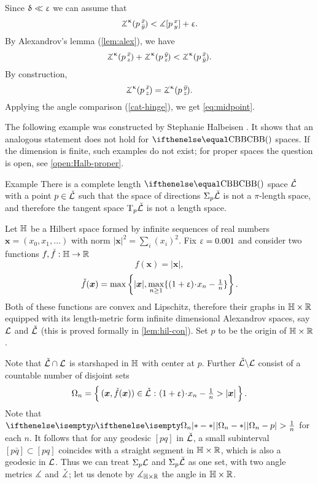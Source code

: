 Since $\updelta\ll \upvarepsilon$  we can assume that 
\[\angk\kappa p{\bar x}{\bar y}<\mangle \hinge pxy+\eps.\]
By  Alexandrov's lemma (\ref{lem:alex}), we have
\[\angk\kappa p{\bar x}{z}+\angk\kappa p{\bar y}{z}< \angk\kappa p{\bar x}{\bar y}.\]
By construction,
\[\angk\kappa p{\bar x}{z}=\angk\kappa p{\bar y}{z}.\]
Applying the angle comparison (\ref{cat-hinge}), we get \ref{eq:midpoint}.
\qeds

The following example was constructed by Stephanie Halbeisen \cite{halbeisen}.
It shows that an analogous statement does not hold for $\Alex{}$ spaces.
If the dimension is finite, such examples do not exist; %
for proper spaces the question is open, see \ref{open:Halb-proper}.

\begin{thm}{Example}\label{Halbeisen's example}
There is a complete length $\Alex{}$ space $\check{\mathcal{L}}$
with a point $p\in\check{\spc{L}}$ such that the space of directions $\Sigma_p\check{\mathcal{L}}$ is not a $\pi$-length space, and therefore the tangent space $\text{\rm T}_p\check{\mathcal{L}}$ is not a length space. 
\end{thm}



Let $\mathbb{H}$ be a Hilbert space formed by infinite sequences of real numbers $\bm{x}=(x_0,x_1,\dots)$ with norm
$|\bm{x}|^2=\sum_i(x_i)^2$. 
Fix $\upvarepsilon=0.001$ and consider two functions $f,\check f:\HH\to\RR$
\[f(\bm{x})=|\bm{x}|,\]
\[\check f(\bm{x})
=
\max\left\{|\bm{x}|,\max_{n\ge1}\{(1+\eps)\cdot x_n-\tfrac{1}{n}\}\right\}.\] 
Both of these functions are convex and Lipschitz, therefore their graphs in $\HH\times \RR$ equipped with its length-metric form infinite dimensional Alexandrov spaces, say $\mathcal{L}$  and $\check{\mathcal{L}}$ (this is proved formally in \ref{lem:hil-con}).
Set $p$ to be the origin of $\HH\times \RR$.

Note that $\check{\spc{L}}\cap\spc{L}$ is starshaped in $\mathbb{H}$ with center at $p$.
Further $\check{\mathcal{L}}\backslash\mathcal{L}$ consist of a countable number of disjoint sets
\[\Omega_n=\set{(\bm{x},\check f(\bm{x}))\in\check{\spc{L}}}{(1+\eps)\cdot x_n-\tfrac{1}{n}>|\bm{x}|}.\]
Note that $\dist{\Omega_n}{p}{}>\tfrac{1}{n}$ for each $n$.
It follows that for any geodesic $[p q]$ in $\check{\mathcal{L}}$,
a small subinterval $[p \bar q]\subset [p q]$ 
coincides with a straight segment in $\HH\times\RR$, 
which is also a geodesic in $\mathcal{L}$.
Thus we can treat $\Sigma_p\mathcal{L}$ and $\Sigma_p\check{\mathcal{L}}$ as one set, with two angle metrics $\measuredangle$ and $\check{\measuredangle}$;
let us denote by $\mangle_{\HH\times \RR}$ the angle in $\HH\times\RR$.

